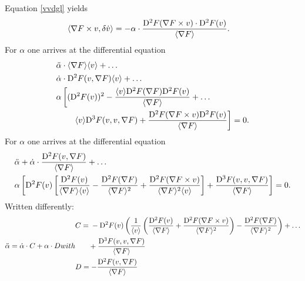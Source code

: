 Equation \eqref{vvdgl} yields
\begin{align}
    \langle  \nabla F  \times v ,  \delta \dot{ v }  \rangle  &=
    -\alpha \cdot \frac{ \mathrm{D}^{ 2 } F ( \nabla F  \times v ) \cdot \mathrm{D}^{ 2 } F ( v ) }{ \langle  \nabla F   \rangle } .
\end{align}
For $ \alpha $ one arrives at the differential equation
\begin{align}
    &\ddot{ \alpha } \cdot \langle  \nabla F   \rangle \langle  v  \rangle  +  \dots\nonumber\\
    &\dot{ \alpha } \cdot \mathrm{D}^{ 2 } F ( v, \nabla F  ) \langle  v  \rangle  +  \dots\nonumber\\
    &\alpha \left[ ( \mathrm{D}^{ 2 } F ( v ) )^2  -
    \frac{ \langle  v  \rangle \mathrm{D}^{ 2 } F ( \nabla F  ) \mathrm{D}^{ 2 } F ( v ) }{ \langle  \nabla F   \rangle }  +  \dots\right.\nonumber\\
    &\qquad\left.\langle  v  \rangle \mathrm{D}^{ 3 } F ( v, v, \nabla F  )  +
    \frac{ \mathrm{D}^{ 2 } F ( \nabla F  \times v ) \mathrm{D}^{ 2 } F ( v ) }{ \langle  \nabla F   \rangle } \right]  =  0 .
\end{align}
For $ \alpha $ one arrives at the differential equation
\begin{align}
    &\ddot{ \alpha }  +  \dot{ \alpha } \cdot \frac{ \mathrm{D}^{ 2 } F ( v, \nabla F  ) }{ \langle  \nabla F   \rangle }  +  \dots\nonumber\\
    &\alpha \left[ \mathrm{D}^{ 2 } F ( v ) \left[ \frac{ \mathrm{D}^{ 2 } F ( v ) }{ \langle  \nabla F   \rangle \langle  v  \rangle }  -
    \frac{ \mathrm{D}^{ 2 } F ( \nabla F  ) }{ \langle  \nabla F   \rangle^2 }  +
    \frac{ \mathrm{D}^{ 2 } F ( \nabla F  \times v ) }{ \langle  \nabla F   \rangle^2 \langle  v  \rangle } \right]  +
    \frac{ \mathrm{D}^{ 3 } F ( v, v, \nabla F  ) }{ \langle  \nabla F   \rangle } \right]  =  0 .
\end{align}
Written differently:
\begin{subequations}
    \begin{align}
        \ddot{ \alpha }   =   \dot{ \alpha } \mult C  +  \alpha \mult D
    \end{align}
    with
    \begin{align}
        &\begin{aligned}
            C   &=
            {}-{} \diff{2}{F}( v )
            \left( \frac{ 1 }{ \skaq{v} }
            \left( \frac{ \diff{2}{F}( v ) }{ \skaq{\grad{F}} }  +
            \frac{ \diff{2}{F}( \grad{F} \times v ) }{ \skaq{\grad{F}}^2 } \right)  -
            \frac{ \diff{2}{F}( \grad{F} ) }{ \skaq{\grad{F}}^2 } \right)  +  \dots  \\
            &\hphantom{={}}
            + \frac{ \diff{3}{F}( v, v, \grad{F} ) }{ \skaq{\grad{F}} }
        \end{aligned}\\
        &D   =   - \frac{ \diff{2}{F}( v, \grad{F} ) }{ \skaq{\grad{F}} }
    \end{align}
\end{subequations}
